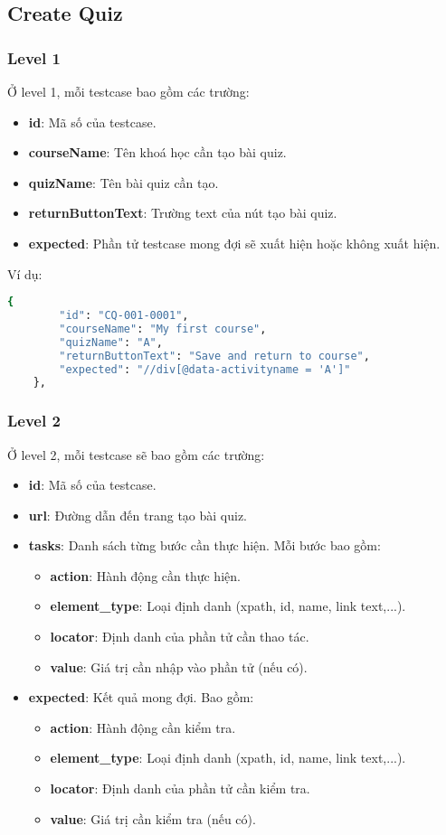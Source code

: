 \subsection{Create Quiz}
\subsubsection{Level 1}
Ở level 1, mỗi testcase bao gồm các trường:
\begin{itemize}
    \item \textbf{id}: Mã số của testcase.
    \item \textbf{courseName}: Tên khoá học cần tạo bài quiz.
    \item \textbf{quizName}: Tên bài quiz cần tạo.
    \item \textbf{returnButtonText}: Trường text của nút tạo bài quiz.
    \item \textbf{expected}: Phần tử testcase mong đợi sẽ xuất hiện hoặc không xuất hiện.
\end{itemize}

Ví dụ:
\begin{lstlisting}[language=bash, caption={Ví dụ testcase CQ-001-0001 ở level 1}, breaklines=true]
    {
        "id": "CQ-001-0001",
        "courseName": "My first course",
        "quizName": "A",
        "returnButtonText": "Save and return to course",
        "expected": "//div[@data-activityname = 'A']"
    },
\end{lstlisting}
\subsubsection{Level 2}

Ở level 2, mỗi testcase sẽ bao gồm các trường:
\begin{itemize}
    \item \textbf{id}: Mã số của testcase.
    \item \textbf{url}: Đường dẫn đến trang tạo bài quiz.
    \item \textbf{tasks}: Danh sách từng bước cần thực hiện. Mỗi bước bao gồm:
\begin{itemize}
    \item \textbf{action}: Hành động cần thực hiện.
    \item \textbf{element\_type}: Loại định danh (xpath, id, name, link text,...).
    \item \textbf{locator}: Định danh của phần tử cần thao tác.
    \item \textbf{value}: Giá trị cần nhập vào phần tử (nếu có).
\end{itemize}
    \item \textbf{expected}: Kết quả mong đợi. Bao gồm:
\begin{itemize}
    \item \textbf{action}: Hành động cần kiểm tra.
    \item \textbf{element\_type}: Loại định danh (xpath, id, name, link text,...).
    \item \textbf{locator}: Định danh của phần tử cần kiểm tra.
    \item \textbf{value}: Giá trị cần kiểm tra (nếu có).
\end{itemize}
\end{itemize}

